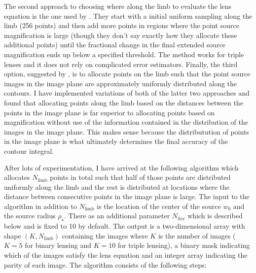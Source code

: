 \documentclass[12pt,dvipsnames]{report}
\begin{document}
The second approach to choosing where along the limb to evaluate the lens equation is the 
one used by \citet{2021MNRAS.503.6143K}. They start with a initial uniform sampling along the limb 
(256 points) and then add more points in regions where the point source magnification is large 
(though they don't say exactly how they allocate these additional points) until the fractional 
change in the final extended source magnification ends up below a specified threshold. 
The method works for triple lenses and it does not rely on complicated error estimators.
Finally, the third option, suggested by \citet{1997ApJ...477..580G}, is to allocate points 
on the limb such that the point source images in the image plane are approximately uniformly 
distributed along  the contours. I have implemented variations of both of the latter two
approaches  and found that allocating points along the limb based on the distances 
between the points in the image plane is far superior to allocating points based on magnification
without use of the information contained in the distribution of the images in the image plane.
This makes sense because the distributution of points in the image 
plane is what ultimately determines the final accuracy of the contour integral.

After lots of experimentation, I have arrived at the following algorithm which allocates
$N_\mathrm{limb}$ points in total such that half of those points are distributed uniformly 
along the limb and the rest is distributed at locations where the distance between consecutive 
points in the image plane is large. The input to the algorithm in addition to $N_\mathrm{limb}$
is the location of the center of the source $w_0$ and the source radius $\rho_\star$. There 
as an additional parameter $N_\mathrm{iter}$ which is described below and is fixed to 10 by 
default. The output is a two-dimensional array with shape $(K, N_\mathrm{limb})$ containing the 
images where $K$ is the number of images ($K=5$ for binary lensing and $K=10$ for triple lensing), 
a binary mask indicating which of the images satisfy the lens equation and an integer array 
indicating the parity of each image. The algorithm consists of the following steps:
\end{document}
